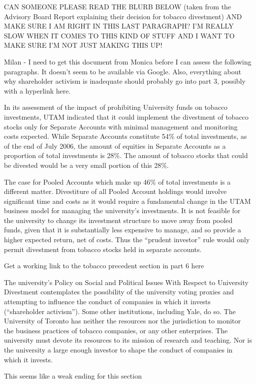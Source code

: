 \begin{vcom}
CAN SOMEONE PLEASE READ THE BLURB BELOW (taken from the Advisory Board Report explaining their decision for tobacco divestment) AND MAKE SURE I AM RIGHT IN THIS LAST PARAGRAPH? I’M REALLY SLOW WHEN IT COMES TO THIS KIND OF STUFF AND I WANT TO MAKE SURE I’M NOT JUST MAKING THIS UP!

	Milan - I need to get this document from Monica before I can assess the following paragraphs. It doesn't seem to be available via Google. Also, everything about why shareholder activism is inadequate should probably go into part 3, possibly with a hyperlink here. 
\end{vcom}



In its assessment of the impact of prohibiting University funds on tobacco investments, UTAM indicated that it could implement the divestment of tobacco stocks only for Separate Accounts with minimal management and monitoring costs expected. 
While Separate Accounts constitute 54\% of total investments, as of the end of July 2006, the amount of equities in Separate Accounts as a proportion of total investments is 28\%. 
The amount of tobacco stocks that could be divested would be a very small portion of this 28\%.



The case for Pooled Accounts which make up 46\% of total investments is a different matter. 
Divestiture of all Pooled Account holdings would involve significant time and costs as it would require a fundamental change in the UTAM business model for managing the university's investments. 
It is not feasible for the university to change its investment structure to move away from pooled funds, given that it is substantially less expensive to manage, and so provide a higher expected return, net of costs. 
Thus the ``prudent investor'' rule would only permit divestment from tobacco stocks held in separate accounts.

\begin{vcom}
	Get a working link to the tobacco precedent section in part 6 here
\end{vcom}







The university's Policy on Social and Political Issues With Respect to University Divestment contemplates the possibility of the university voting proxies and attempting to influence the conduct of companies in which it invests (``shareholder activism'').
Some other institutions, including Yale, do so. 
The University of Toronto has neither the resources nor the jurisdiction to monitor the business practices of tobacco companies, or any other enterprises. 
The university must devote its resources to its mission of research and teaching. 
Nor is the university a large enough investor to shape the conduct of companies in which it invests. 

\begin{vcom}
	This seems like a weak ending for this section
\end{vcom}


